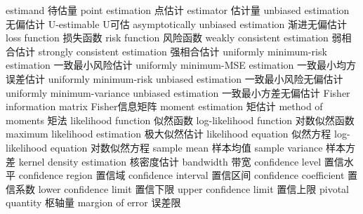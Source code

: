 {estimand} 
{待估量}
{point estimation} 
{点估计}
{estimator} 
{估计量}
{unbiased estimation} 
{无偏估计}
{U-estimable} 
{U可估}
{asymptotically unbiased estimation} 
{渐进无偏估计}
{loss function} 
{损失函数}
{risk function} 
{风险函数}
{weakly consistent estimation} 
{弱相合估计}
{strongly consistent estimation} 
{强相合估计}
{uniformly minimum-risk estimation} 
{一致最小风险估计}
{uniformly minimum-MSE estimation} 
{一致最小均方误差估计}
{uniformly minimum-risk unbiased estimation} 
{一致最小风险无偏估计}
{uniformly minimum-variance unbiased estimation} 
{一致最小方差无偏估计}
{Fisher information matrix} 
{Fisher信息矩阵}
{moment estimation} 
{矩估计}
{method of moments} 
{矩法}
{likelihood function} 
{似然函数}
{log-likelihood function} 
{对数似然函数}
{maximum likelihood estimation} 
{极大似然估计}
{likelihood equation} 
{似然方程}
{log-likelihood equation} 
{对数似然方程}
{sample mean} 
{样本均值}
{sample variance} 
{样本方差}
{kernel density estimation}
{核密度估计}
{bandwidth}
{带宽}
{confidence level} 
{置信水平}
{confidence region} 
{置信域}
{confidence interval} 
{置信区间}
{confidence coefficient} 
{置信系数}
{lower confidence limit} 
{置信下限}
{upper confidence limit} 
{置信上限}
{pivotal quantity} 
{枢轴量}
{margion of error} 
{误差限}